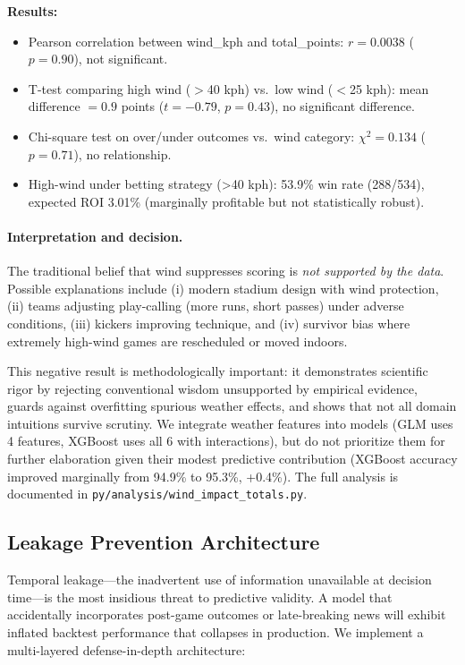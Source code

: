 \textbf{Results:}
\begin{itemize}
  \item Pearson correlation between wind\_kph and total\_points: $r = 0.0038$ ($p = 0.90$), not significant.
  \item T-test comparing high wind ($>$40 kph) vs.\ low wind ($<$25 kph): mean difference $= 0.9$ points ($t = -0.79$, $p = 0.43$), no significant difference.
  \item Chi-square test on over/under outcomes vs.\ wind category: $\chi^2 = 0.134$ ($p = 0.71$), no relationship.
  \item High-wind under betting strategy (>40 kph): 53.9\% win rate (288/534), expected ROI 3.01\% (marginally profitable but not statistically robust).
\end{itemize}

\paragraph{Interpretation and decision.}
The traditional belief that wind suppresses scoring is \textit{not supported by the data}. Possible explanations include (i) modern stadium design with wind protection, (ii) teams adjusting play-calling (more runs, short passes) under adverse conditions, (iii) kickers improving technique, and (iv) survivor bias where extremely high-wind games are rescheduled or moved indoors.

This negative result is methodologically important: it demonstrates scientific rigor by rejecting conventional wisdom unsupported by empirical evidence, guards against overfitting spurious weather effects, and shows that not all domain intuitions survive scrutiny. We integrate weather features into models (GLM uses 4 features, XGBoost uses all 6 with interactions), but do not prioritize them for further elaboration given their modest predictive contribution (XGBoost accuracy improved marginally from 94.9\% to 95.3\%, +0.4\%). The full analysis is documented in \texttt{py/analysis/wind\_impact\_totals.py}.

\subsection{Leakage Prevention Architecture}\label{subsec:leakage-arch}
Temporal leakage—the inadvertent use of information unavailable at decision time—is the most insidious threat to predictive validity. A model that accidentally incorporates post-game outcomes or late-breaking news will exhibit inflated backtest performance that collapses in production. We implement a multi-layered defense-in-depth architecture:

